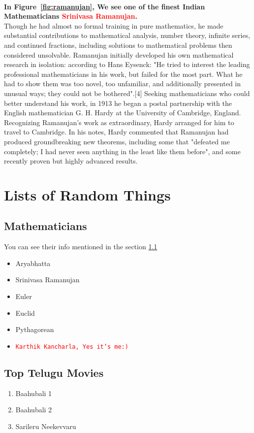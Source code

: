 \documentclass{article}
\begin{document}
\\
\textbf{In Figure~\ref{fig:ramanujan}, We see one of the finest Indian Mathematicians \textcolor{red}{Srinivasa Ramanujan}.}\\

Though he had almost no formal training in pure mathematics, he made substantial contributions to mathematical analysis, number theory, infinite series, and continued fractions, including solutions to mathematical problems then considered unsolvable. Ramanujan initially developed his own mathematical research in isolation: according to Hans Eysenck: "He tried to interest the leading professional mathematicians in his work, but failed for the most part. What he had to show them was too novel, too unfamiliar, and additionally presented in unusual ways; they could not be bothered".[4] Seeking mathematicians who could better understand his work, in 1913 he began a postal partnership with the English mathematician G. H. Hardy at the University of Cambridge, England. Recognizing Ramanujan's work as extraordinary, Hardy arranged for him to travel to Cambridge. In his notes, Hardy commented that Ramanujan had produced groundbreaking new theorems, including some that "defeated me completely; I had never seen anything in the least like them before", and some recently proven but highly advanced results.




\section {Lists of Random Things}
\subsection{Mathematicians}
\label{sec: mathemat}
You can see their info mentioned in the section \ref{sec: mathemat}
\begin{itemize}
	\item Aryabhatta
	\item Srinivasa Ramanujan
	\item Euler
	\item Euclid
	\item Pythagorean
	\item \texttt{\textcolor{red}{\huge Karthik Kancharla, Yes it's me:)}}
	
\end{itemize}
\subsection{Top Telugu Movies}
\begin{enumerate}
	\item Baahubali 1
	\item Baahubali 2
	\item Sarileru Neekevvaru
\end{enumerate}
\end{document}
